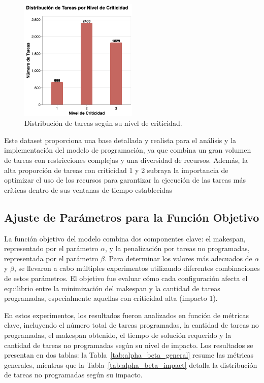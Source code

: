 \documentclass{article}
\begin{document}
\begin{figure}[H]
    \centering
    \includegraphics[width=0.5\textwidth]{imgs/barras_impacto.png}
    \caption{Distribución de tareas según su nivel de criticidad.}
    \label{fig:barras_impacto}
\end{figure}

Este dataset proporciona una base detallada y realista para el análisis y la implementación del modelo de programación, ya que combina un gran volumen de tareas con restricciones complejas y una diversidad de recursos. Además, la alta proporción de tareas con criticidad 1 y 2 subraya la importancia de optimizar el uso de los recursos para garantizar la ejecución de las tareas más críticas dentro de sus ventanas de tiempo establecidas

\subsection{Ajuste de Parámetros para la Función Objetivo}

La función objetivo del modelo combina dos componentes clave: el makespan, representado por el parámetro \( \alpha \), y la penalización por tareas no programadas, representada por el parámetro \( \beta \). Para determinar los valores más adecuados de \( \alpha \) y \( \beta \), se llevaron a cabo múltiples experimentos utilizando diferentes combinaciones de estos parámetros. El objetivo fue evaluar cómo cada configuración afecta el equilibrio entre la minimización del makespan y la cantidad de tareas programadas, especialmente aquellas con criticidad alta (impacto 1).

En estos experimentos, los resultados fueron analizados en función de métricas clave, incluyendo el número total de tareas programadas, la cantidad de tareas no programadas, el makespan obtenido, el tiempo de solución requerido y la cantidad de tareas no programadas según su nivel de impacto. Los resultados se presentan en dos tablas: la Tabla~\ref{tab:alpha_beta_general} resume las métricas generales, mientras que la Tabla~\ref{tab:alpha_beta_impact} detalla la distribución de tareas no programadas según su impacto.
\end{document}

